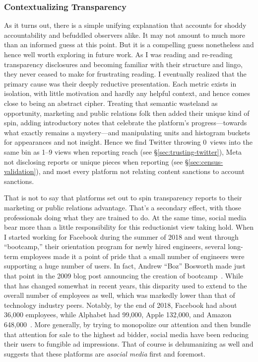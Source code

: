 \subsubsection{Contextualizing Transparency}

As it turns out, there is a simple unifying explanation that accounts for shoddy
accountability and befuddled observers alike. It may not amount to much more
than an informed guess at this point. But it is a compelling guess nonetheless
and hence well worth exploring in future work. As I was reading and re-reading
transparency disclosures and becoming familiar with their structure and lingo,
they never ceased to make for frustrating reading. I eventually realized that
the primary cause was their deeply reductive presentation. Each metric exists in
isolation, with little motivation and hardly any helpful context, and hence
comes close to being an abstract cipher. Treating that semantic wasteland as
opportunity, marketing and public relations folk then added their unique kind of
spin, adding introductory notes that celebrate the platform's progress---towards
what exactly remains a mystery---and manipulating units and histogram
buckets for appearances and not insight. Hence we find Twitter throwing 0~views
into the same bin as 1--9 views when reporting reach (see
\S\ref{sec:trusting-twitter}), Meta not disclosing  reports or unique
pieces when reporting  (see \S\ref{sec:census-validation}), and most
every platform not relating content sanctions to account sanctions.

That is not to say that platforms set out to spin transparency reports to their
marketing or public relations advantage. That's a secondary effect, with those
professionals doing what they are trained to do. At the same time, social media
bear more than a little responsibility for this reductionist view taking hold.
When I started working for Facebook during the summer of 2018 and went through
``bootcamp,'' their orientation program for newly hired engineers, several
long-term employees made it a point of pride that a small number of engineers
were supporting a huge number of users. In fact, Andrew ``Boz'' Bosworth made
just that point in the 2009 blog post announcing the creation of
bootcamp~\cite{Bosworth2009}. While that has changed somewhat in recent years,
this disparity used to extend to the overall number of employees as well, which
was markedly lower than that of technology industry peers. Notably, by the end
of 2018, Facebook had about 36,000 employees, while Alphabet had 99,000, Apple
132,000, and Amazon
648,000~\cite{MacrotrendsAlphabet,MacrotrendsAmazon,MacrotrendsApple,MacrotrendsMeta}.
More generally, by trying to monopolize our attention and then bundle that
attention for sale to the highest ad bidder, social media have been reducing
their users to fungible ad impressions. That of course is dehumanizing as well
and suggests that these platforms are \emph{asocial media} first and foremost.

